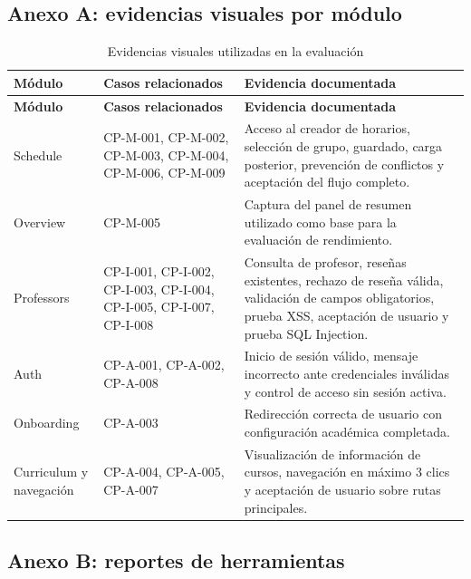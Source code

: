 \documentclass[11pt,spanish]{article}
\begin{document}
\subsection{Anexo A: evidencias visuales por módulo}

\begin{longtable}{p{3cm} p{4.2cm} p{7cm}}
\caption{Evidencias visuales utilizadas en la evaluación}\label{tab:anexo-evidencias}\\
\toprule
\textbf{Módulo} & \textbf{Casos relacionados} & \textbf{Evidencia documentada} \\
\midrule
\endfirsthead
\toprule
\textbf{Módulo} & \textbf{Casos relacionados} & \textbf{Evidencia documentada} \\
\midrule
\endhead
Schedule & CP-M-001, CP-M-002, CP-M-003, CP-M-004, CP-M-006, CP-M-009 & Acceso al creador de horarios, selección de grupo, guardado, carga posterior, prevención de conflictos y aceptación del flujo completo. \\
Overview & CP-M-005 & Captura del panel de resumen utilizado como base para la evaluación de rendimiento. \\
Professors & CP-I-001, CP-I-002, CP-I-003, CP-I-004, CP-I-005, CP-I-007, CP-I-008 & Consulta de profesor, reseñas existentes, rechazo de reseña válida, validación de campos obligatorios, prueba XSS, aceptación de usuario y prueba SQL Injection. \\
Auth & CP-A-001, CP-A-002, CP-A-008 & Inicio de sesión válido, mensaje incorrecto ante credenciales inválidas y control de acceso sin sesión activa. \\
Onboarding & CP-A-003 & Redirección correcta de usuario con configuración académica completada. \\
Curriculum y navegación & CP-A-004, CP-A-005, CP-A-007 & Visualización de información de cursos, navegación en máximo 3 clics y aceptación de usuario sobre rutas principales. \\
\bottomrule
\end{longtable}

\subsection{Anexo B: reportes de herramientas}
\end{document}
